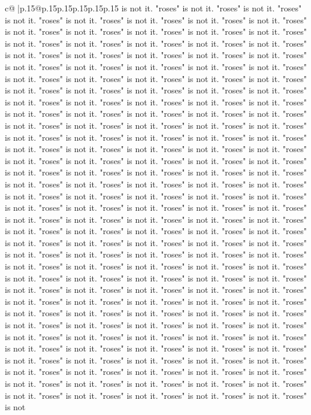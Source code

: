 \documentclass{article}
\begin{document}
{\begin{supertabular}{c@{$\;$}|p{.15\linewidth}@{}p{.15\linewidth}p{.15\linewidth}p{.15\linewidth}p{.15\linewidth}p{.15\linewidth}}
{{{is not it. "roses" is not it. "roses" is not it. "roses" is not it. "roses" is not it. "roses" is not it. "roses" is not it. "roses" is not it. "roses" is not it. "roses" is not it. "roses" is not it. "roses" is not it. "roses" is not it. "roses" is not it. "roses" is not it. "roses" is not it. "roses" is not it. "roses" is not it. "roses" is not it. "roses" is not it. "roses" is not it. "roses" is not it. "roses" is not it. "roses" is not it. "roses" is not it. "roses" is not it. "roses" is not it. "roses" is not it. "roses" is not it. "roses" is not it. "roses" is not it. "roses" is not it. "roses" is not it. "roses" is not it. "roses" is not it. "roses" is not it. "roses" is not it. "roses" is not it. "roses" is not it. "roses" is not it. "roses" is not it. "roses" is not it. "roses" is not it. "roses" is not it. "roses" is not it. "roses" is not it. "roses" is not it. "roses" is not it. "roses" is not it. "roses" is not it. "roses" is not it. "roses" is not it. "roses" is not it. "roses" is not it. "roses" is not it. "roses" is not it. "roses" is not it. "roses" is not it. "roses" is not it. "roses" is not it. "roses" is not it. "roses" is not it. "roses" is not it. "roses" is not it. "roses" is not it. "roses" is not it. "roses" is not it. "roses" is not it. "roses" is not it. "roses" is not it. "roses" is not it. "roses" is not it. "roses" is not it. "roses" is not it. "roses" is not it. "roses" is not it. "roses" is not it. "roses" is not it. "roses" is not it. "roses" is not it. "roses" is not it. "roses" is not it. "roses" is not it. "roses" is not it. "roses" is not it. "roses" is not it. "roses" is not it. "roses" is not it. "roses" is not it. "roses" is not it. "roses" is not it. "roses" is not it. "roses" is not it. "roses" is not it. "roses" is not it. "roses" is not it. "roses" is not it. "roses" is not it. "roses" is not it. "roses" is not it. "roses" is not it. "roses" is not it. "roses" is not it. "roses" is not it. "roses" is not it. "roses" is not it. "roses" is not it. "roses" is not it. "roses" is not it. "roses" is not it. "roses" is not it. "roses" is not it. "roses" is not it. "roses" is not it. "roses" is not it. "roses" is not it. "roses" is not it. "roses" is not it. "roses" is not it. "roses" is not it. "roses" is not it. "roses" is not it. "roses" is not it. "roses" is not it. "roses" is not it. "roses" is not it. "roses" is not it. "roses" is not it. "roses" is not it. "roses" is not it. "roses" is not it. "roses" is not it. "roses" is not it. "roses" is not it. "roses" is not it. "roses" is not it. "roses" is not it. "roses" is not it. "roses" is not it. "roses" is not it. "roses" is not it. "roses" is not it. "roses" is not it. "roses" is not it. "roses" is not it. "roses" is not it. "roses" is not it. "roses" is not it. "roses" is not it. "roses" is not it. "roses" is not it. "roses" is not it. "roses" is not it. "roses" is not it. "roses" is not it. "roses" is not it. "roses" is not it. "roses" is not it. "roses" is not it. "roses" is not it. "roses" is not it. "roses" is not it. "roses" is not it. "roses" is not it. "roses" is not it. "roses" is not it. "roses" is not it. "roses" is not it. "roses" is not }}}
\end{supertabular}}
\end{document}
